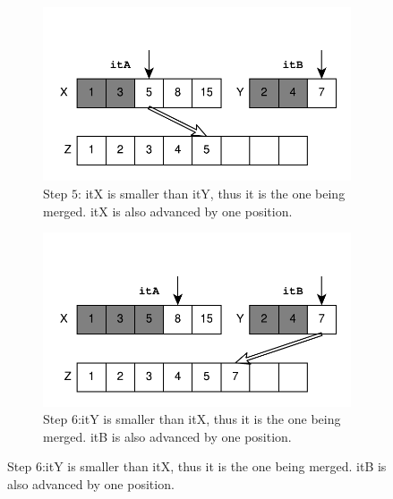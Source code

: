 \begin{figure}
	\begin{subfigure}[b]{0.45\textwidth}
		\centering
		\includegraphics[trim=0 0 0 45,clip,width=\textwidth]{sources/median_sorted_arrays/images/mergearrays4}
		\caption{Step $5$:  itX is smaller than itY, thus it is the one being merged. itX is also advanced by one position.}
		\label{fig:median_sorted_array:mergearray4}
	\end{subfigure}
	\hfill
	\begin{subfigure}[b]{0.45\textwidth}
		\centering
		\includegraphics[trim=0 0 0 45,clip,width=\textwidth]{sources/median_sorted_arrays/images/mergearrays5}
		\caption{Step $6$:itY is smaller than itX, thus it is the one being merged. itB is also advanced by one position.}
		\label{fig:median_sorted_array:mergearray5}
	\end{subfigure}
	\hfill


\end{figure}
